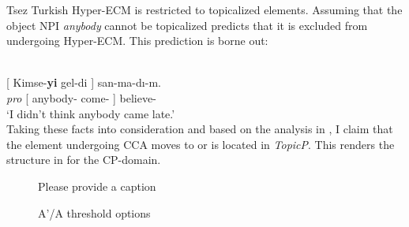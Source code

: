 \documentclass[output=paper,colorlinks,citecolor=brown]{langscibook}
\begin{document}
\ea\label{lohningertsez}
{Tsez} \citep[610]{polinsky2001long}
\z 
\z 
Turkish Hyper-ECM is restricted to topicalized elements. Assuming that the object NPI \emph{anybody} cannot be topicalized predicts that it is excluded from undergoing Hyper-ECM. This prediction is borne out:

 \citep[14]{csener2008non}\\
\gll * {} {[} Kimse-\textbf{yi} gel-di {]} san-ma-d{\i}-m.\\
{} \emph{pro} [ anybody-\textbf{} come- ] believe-\\
\glt \phantom{*} ‘I didn’t think anybody came late.'\\
\z
Taking these facts into consideration and based on the analysis in \citet{csener2008non}, I claim that the element undergoing CCA moves to or is located in \emph{TopicP}. This renders the structure in  for the CP-domain.

\begin{figure}\RawFloats\CenterFloatBoxes
\begin{floatrow}
{\caption{\color{red}Please provide a caption}\label{fig:lohninger:tree2}} 

{\caption{A'/A threshold options\label{lohningertab:3}}}
\end{floatrow}
\end{figure}
\end{document}
